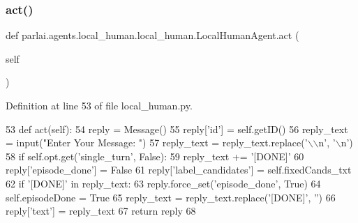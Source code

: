 \subsubsection{\texorpdfstring{act()}{act()}}
{\footnotesize\ttfamily def parlai.\+agents.\+local\+\_\+human.\+local\+\_\+human.\+Local\+Human\+Agent.\+act (\begin{DoxyParamCaption}\item[{}]{self }\end{DoxyParamCaption})}



Definition at line 53 of file local\+\_\+human.\+py.


\begin{DoxyCode}
53     \textcolor{keyword}{def }act(self):
54         reply = Message()
55         reply[\textcolor{stringliteral}{'id'}] = self.getID()
56         reply\_text = input(\textcolor{stringliteral}{"Enter Your Message: "})
57         reply\_text = reply\_text.replace(\textcolor{stringliteral}{'\(\backslash\)\(\backslash\)n'}, \textcolor{stringliteral}{'\(\backslash\)n'})
58         \textcolor{keywordflow}{if} self.opt.get(\textcolor{stringliteral}{'single\_turn'}, \textcolor{keyword}{False}):
59             reply\_text += \textcolor{stringliteral}{'[DONE]'}
60         reply[\textcolor{stringliteral}{'episode\_done'}] = \textcolor{keyword}{False}
61         reply[\textcolor{stringliteral}{'label\_candidates'}] = self.fixedCands\_txt
62         \textcolor{keywordflow}{if} \textcolor{stringliteral}{'[DONE]'} \textcolor{keywordflow}{in} reply\_text:
63             reply.force\_set(\textcolor{stringliteral}{'episode\_done'}, \textcolor{keyword}{True})
64             self.episodeDone = \textcolor{keyword}{True}
65             reply\_text = reply\_text.replace(\textcolor{stringliteral}{'[DONE]'}, \textcolor{stringliteral}{''})
66         reply[\textcolor{stringliteral}{'text'}] = reply\_text
67         \textcolor{keywordflow}{return} reply
68 
\end{DoxyCode}
\mbox{\label{classparlai_1_1agents_1_1local__human_1_1local__human_1_1LocalHumanAgent_abc9993870cbd73a7706abef20021d6ca}} 
